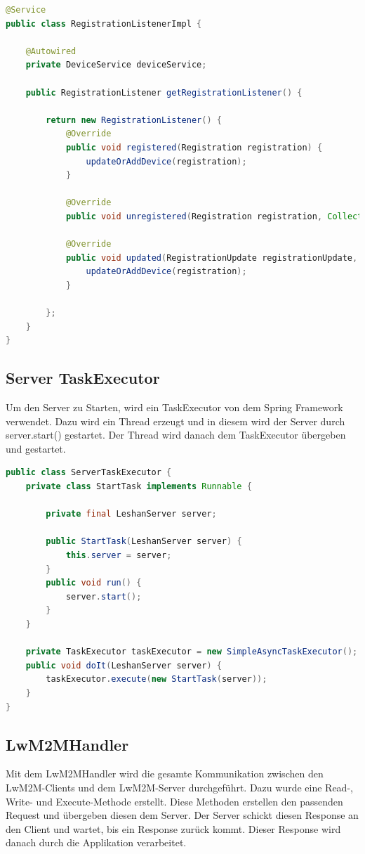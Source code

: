 \begin{lstlisting}[language=java]
@Service
public class RegistrationListenerImpl {

	@Autowired
	private DeviceService deviceService;

	public RegistrationListener getRegistrationListener() {

		return new RegistrationListener() {
			@Override
			public void registered(Registration registration) {
				updateOrAddDevice(registration);
			}

			@Override
			public void unregistered(Registration registration, Collection<Observation> observerColl) {}

			@Override
			public void updated(RegistrationUpdate registrationUpdate, Registration registration) {
				updateOrAddDevice(registration);
			}

		};
	}
}
\end{lstlisting}

\subsection{Server TaskExecutor}
Um den Server zu Starten, wird ein TaskExecutor von dem Spring Framework verwendet. Dazu wird ein Thread erzeugt und in diesem wird der Server durch server.start() gestartet. Der Thread wird danach dem TaskExecutor übergeben und gestartet.
\begin{lstlisting}[language=java]
public class ServerTaskExecutor {
	private class StartTask implements Runnable {

		private final LeshanServer server;

		public StartTask(LeshanServer server) {
			this.server = server;
		}
		public void run() {
			server.start();
		}
	}

	private TaskExecutor taskExecutor = new SimpleAsyncTaskExecutor();
	public void doIt(LeshanServer server) {
		taskExecutor.execute(new StartTask(server));
	}
}
\end{lstlisting}

\subsection{LwM2MHandler}
Mit dem LwM2MHandler wird die gesamte Kommunikation zwischen den LwM2M-Clients und dem LwM2M-Server durchgeführt. Dazu wurde eine Read-, Write- und Execute-Methode  erstellt. Diese Methoden erstellen den passenden Request und übergeben diesen dem Server. Der Server schickt diesen Response an den Client und wartet, bis ein Response zurück kommt. Dieser Response wird danach durch die Applikation verarbeitet. 


